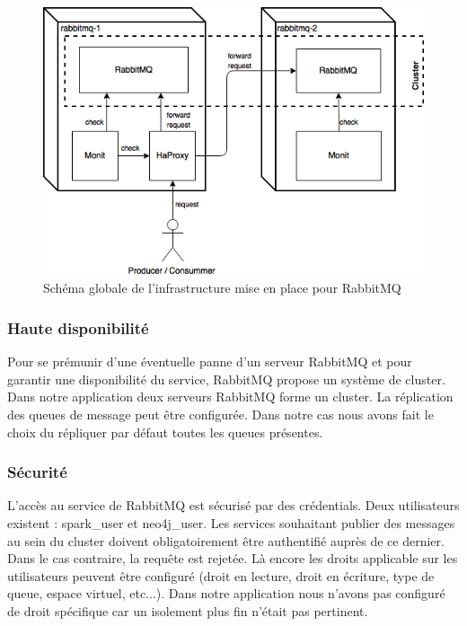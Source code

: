 \begin{figure}
    \centering
    \includegraphics[scale=0.5]{pics/rabbitmq-infra.png}
    \caption{Schéma globale de l'infrastructure mise en place pour RabbitMQ}
\end{figure}
\FloatBarrier
\subsubsection{Haute disponibilité}

Pour se prémunir d'une éventuelle panne d'un serveur RabbitMQ et pour garantir une disponibilité du service, RabbitMQ propose un système de cluster. Dans notre application deux serveurs RabbitMQ forme un cluster. La réplication des queues de message peut être configurée. Dans notre cas nous avons fait le choix du répliquer par défaut toutes les queues présentes.

\subsubsection{Sécurité}

L'accès au service de RabbitMQ est sécurisé par des crédentials. Deux utilisateurs existent : spark\_user et neo4j\_user. Les services souhaitant publier des messages au sein du cluster doivent obligatoirement être authentifié auprès de ce dernier. Dans le cas contraire, la requête est rejetée. Là encore les droits applicable sur les utilisateurs peuvent être configuré (droit en lecture, droit en écriture, type de queue, espace virtuel, etc...). Dans notre application nous n'avons pas configuré de droit spécifique car un isolement plus fin n'était pas pertinent.

